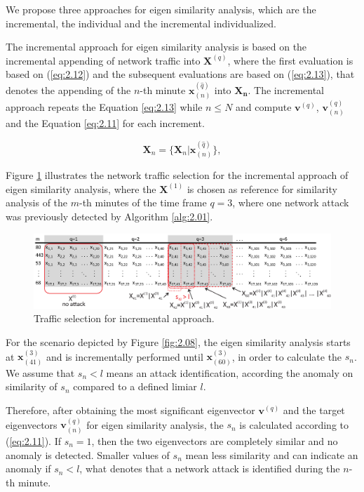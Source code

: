 We propose three approaches for eigen similarity analysis, which are the incremental, the individual and the incremental individualized.

The incremental approach for eigen similarity analysis is based on the incremental appending of network traffic into $\pmb{X}^{(q)}$, where the first evaluation is based on (\ref{eq:2.12}) and the subsequent evaluations are based on (\ref{eq:2.13}), that denotes the appending of the $n$-th minute $\pmb{x}^{(\hat{q})}_{(n)}$ into $\pmb{X_n}$. The incremental approach repeats the Equation \ref{eq:2.13} while $n \leq N$ and compute $\pmb{v}^{(q)}$, $\pmb{v}_{(n)}^{(q)}$ and the Equation \ref{eq:2.11} for each increment.

\begin{equation}\label{eq:2.13}
\pmb{X}_{n} = \{\pmb{X}_{n} | \pmb{x}^{(\hat{q})}_{(n)}\},
\end{equation}

Figure \ref{fig:2.88} illustrates the network traffic selection for the incremental approach of eigen similarity analysis, where the $\pmb{X}^{(1)}$ is chosen as reference for similarity analysis of the $m$-th minutes of the time frame $q=3$, where one network attack was previously detected by Algorithm \ref{alg:2.01}. 

\begin{figure}[h!]
     \includegraphics[width=15cm]{figs/ch2/incremental.eps}
     \caption{Traffic selection for incremental approach.}
     \label{fig:2.88}
\end{figure}

For the scenario depicted by Figure \ref{fig:2.08}, the eigen similarity analysis starts at $\pmb{x}^{(3)}_{(41)}$ and is incrementally performed until $\pmb{x}^{(3)}_{(60)}$, in order to calculate the $s_n$. We assume that $s_n < l$ means an attack identification, according the anomaly on similarity of $s_n$ compared to a defined limiar $l$. 

Therefore, after obtaining the most significant eigenvector $\pmb{v}^{(q)}$ and the target eigenvectors $\pmb{v}_{(n)}^{(q)}$ for eigen similarity analysis, the $s_n$ is calculated according to (\ref{eq:2.11}). If $s_n = 1$, then the two eigenvectors are completely similar and no anomaly is detected. Smaller values of $s_n$ mean less similarity and can indicate an anomaly if $s_n < l$, what denotes that a network attack is identified during the $n$-th minute. 


